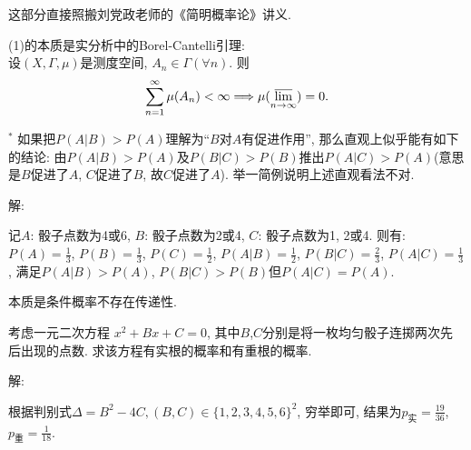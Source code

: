 \documentclass[standard]{ExBook}
\begin{document}
\begin{qitems}
\begin{bbox}
\textcolor{themeColor}{\selectfont {} 这部分直接照搬刘党政老师的《简明概率论》讲义.}

\textcolor{themeColor}{\selectfont {} (1)的本质是实分析中的Borel-Cantelli引理:\\
设$(X,\Gamma,\mu)$是测度空间, $A_{n}\in\Gamma(\forall n)$. 则
$$\sum\limits_{n=1}^{\infty}\mu(A_{n}) < \infty \Longrightarrow \mu(\varlimsup\limits_{n\to\infty})=0.$$}
    \end{bbox}

\vspace{-5em}

    \begin{bbox}
    \begin{shaded}
        \qitem$^*$
如果把$P(A|B) > P(A)$理解为“$B$对$A$有促进作用”, 那么直观上似乎能有如下的结论: 由$P(A|B) > P(A)$及$P(B|C) > P(B)$推出$P(A|C) > P(A)$(意思是$B$促进了$A$, $C$促进了$B$, 故$C$促进了$A$). 举一简例说明上述直观看法不对.
    \end{shaded}
    \end{bbox}

\vspace{-5em}

    \begin{bbox}
解: 

记$A$: 骰子点数为4或6, $B$: 骰子点数为2或4, $C$: 骰子点数为1, 2或4. 则有: $P(A)=\frac{1}{3}$, $P(B)=\frac{1}{3}$, $P(C)=\frac{1}{2}$, $P(A|B)=\frac{1}{2}$, $P(B|C)=\frac{2}{3}$, $P(A|C)=\frac{1}{3}$, 满足$P(A|B)>P(A)$, $P(B|C)>P(B)$但$P(A|C)=P(A)$.

\textcolor{themeColor}{\selectfont {} 本质是条件概率不存在传递性.}
    \end{bbox}

\vspace{-5em}

    \begin{bbox}
    \begin{shaded}
        \qitem
考虑一元二次方程 $x^{2} + Bx + C = 0$, 其中$B$,$C$分别是将一枚均匀骰子连掷两次先后出现的点数. 求该方程有实根的概率和有重根的概率.
    \end{shaded}
    \end{bbox}

\vspace{-5em}

    \begin{bbox}
解: 

根据判别式$\Delta=B^2-4C,(B,C)\in\{1,2,3,4,5,6\}^2$, 穷举即可, 结果为$p_{\text{实}}=\frac{19}{36}$, $p_{\text{重}}=\frac{1}{18}$.
    \end{bbox}


\end{qitems}
\end{document}
